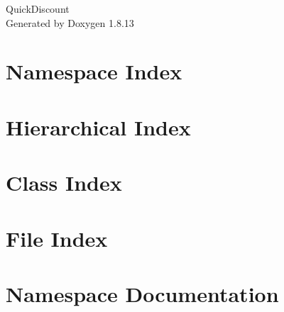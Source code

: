 \documentclass[twoside]{book}
\newcommand{\+}{\discretionary{\mbox{\scriptsize$\hookleftarrow$}}{}{}}
\newcommand{\clearemptydoublepage}{%
  \newpage{\pagestyle{empty}\cleardoublepage}%
}
\begin{document}
\hypersetup{pageanchor=false,
             bookmarksnumbered=true,
             pdfencoding=unicode
            }
\begin{titlepage}
\vspace*{7cm}
\begin{center}%
{\Large Quick\+Discount }\\
\vspace*{1cm}
{\large Generated by Doxygen 1.8.13}\\
\end{center}
\end{titlepage}
\clearemptydoublepage
{}
\tableofcontents
\clearemptydoublepage
{}
\hypersetup{pageanchor=true}

\chapter{Namespace Index}

\chapter{Hierarchical Index}

\chapter{Class Index}

\chapter{File Index}

\chapter{Namespace Documentation}







\end{document}
